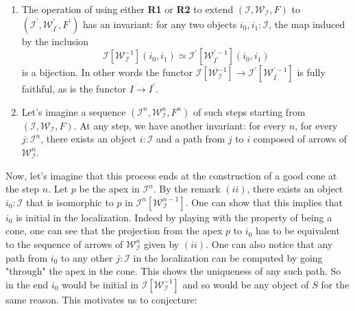 \documentclass{article}
\numberwithin{equation}{section}
\theoremstyle{definition}
\theoremstyle{plain}
\begin{document}
\begin{enumerate}[label = $(\roman*)$]
	\item The operation of using either \textbf{R1} or \textbf{R2} to extend $(\mathcal{I}, \mathcal{W}_{\mathcal{I}}, F)$ to $(\mathcal{I}^{\prime}, \mathcal{W}^{\prime}_{I^{\prime}}, F^{\prime})$ has an invariant: for any two objects $i_0,i_1: \mathcal{I}$, the map induced by the inclusion \[\mathcal{I}[\mathcal{W}^{-1}_{\mathcal{I}}](i_0,i_1) \simeq \mathcal{I}^{\prime}[\mathcal{W}^{\prime-1}_{I^{\prime}}](i_0,i_1)\]
	is a bijection. In other words the functor $\mathcal{I}[\mathcal{W}^{-1}_{\mathcal{I}}]\to \mathcal{I}^{\prime}[\mathcal{W}^{\prime-1}_{I^{\prime}}]$ is fully faithful, as is the functor $I \to I^{\prime}$.
	\item Let's imagine a sequence $(\mathcal{I}^n, \mathcal{W}_{\mathcal{I}}^n, F^n)$ of such steps starting from $(\mathcal{I}, \mathcal{W}_{\mathcal{I}}, F)$. At any step, we have another invariant: for every $n$, for every $j:\mathcal{I}^n$, there exists an object $i:\mathcal{I}$ and a path from $j$ to $i$ composed of arrows of $\mathcal{W}_{\mathcal{I}}^n$.
\end{enumerate}

Now, let's imagine that this process ends at the construction of a good cone at the step $n$. Let $p$ be the apex in $\mathcal{I}^n$. By the remark $(ii)$, there exists an object $i_0:\mathcal{I}$ that is isomorphic to $p$ in $\mathcal{I}^n[\mathcal{W}^{n-1}_{\mathcal{I}}]$. One can show that this implies that $i_0$ is initial in the localization. Indeed by playing with the property of being a cone, one can see that the projection from the apex $p$ to $i_0$ has to be equivalent to the sequence of arrows of $\mathcal{W}_{\mathcal{I}}^n$ given by $(ii)$. One can also notice that any path from $i_0$ to any other $j:\mathcal{I}$ in the localization can be computed by going "through" the apex in the cone. This shows the uniqueness of any such path. So in the end $i_0$ would be initial in $\mathcal{I}[\mathcal{W}^{-1}_{\mathcal{I}}]$ and so would be any object of $S$ for the same reason. This motivates us to conjecture:
\end{document}
